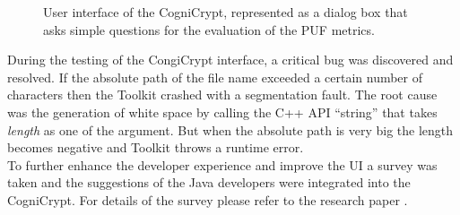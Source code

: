 \begin{figure}
\centering
{}
\caption{User interface of the CogniCrypt, represented as a dialog box that asks simple questions for the evaluation of the PUF metrics.}
\label{img:cogni_ui}
\end{figure}

During the testing of the CongiCrypt interface, a critical bug was discovered and resolved. If the absolute path of the file name exceeded a certain number of characters then the Toolkit crashed with a segmentation fault. The root cause was the generation of white space by calling the C++ API ``string'' that takes \emph{length} as one of the argument. But when the absolute path is very big the length becomes negative and Toolkit throws a runtime error.\\

To further enhance the developer experience and improve the UI a survey was taken and the suggestions of the Java developers were integrated into the CogniCrypt. For details of the survey please refer to the research paper \cite{crypto_icse}.

